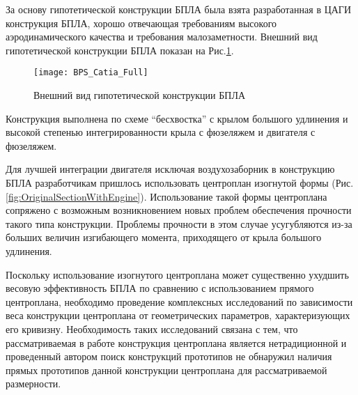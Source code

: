 





За основу гипотетической конструкции БПЛА была взята разработанная в ЦАГИ конструкция БПЛА, хорошо отвечающая требованиям высокого аэродинамического качества и требования малозаметности. Внешний вид гипотетической конструкции БПЛА показан на Рис.\ref{fig:BPLA_TSAGI}.
 

  
  



\begin{figure}[ht]
\centering
\texttt{[image: BPS\_Catia\_Full]}
\caption{Внешний вид гипотетической конструкции БПЛА}
\label{fig:BPLA_TSAGI}
\end{figure}

Конструкция выполнена по схеме ``бесхвостка'' с крылом большого удлинения и высокой степенью интегрированности крыла с фюзеляжем и двигателя с фюзеляжем. 

Для лучшей интеграции двигателя исключая воздухозаборник в конструкцию БПЛА разработчикам пришлось использовать центроплан изогнутой формы (Рис.\ref{fig:OriginalSectionWithEngine}). Использование такой формы центроплана сопряжено с возможным возникновением новых проблем обеспечения прочности такого типа конструкции. Проблемы прочности в этом случае усугубляются из-за больших величин изгибающего момента, приходящего от крыла большого удлинения. 

Поскольку использование изогнутого центроплана может существенно ухудшить весовую эффективность БПЛА по сравнению с использованием прямого центроплана, необходимо проведение комплексных исследований по зависимости веса конструкции центроплана от геометрических параметров, характеризующих его кривизну. 
Необходимость таких исследований связана с тем, что рассматриваемая в работе конструкция центроплана является нетрадиционной и проведенный автором поиск конструкций прототипов не обнаружил наличия прямых прототипов данной конструкции центроплана для рассматриваемой размерности.

